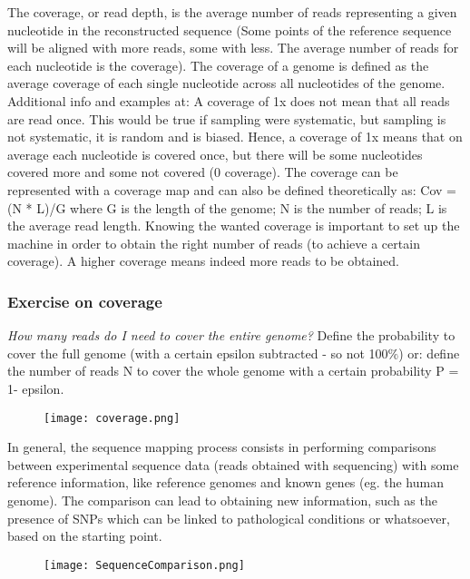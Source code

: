 The coverage, or read depth, is the average number of reads representing a given nucleotide in the reconstructed sequence (Some points of the reference sequence will be aligned with more reads, some with less. The average number of reads for each nucleotide is the coverage). 
The coverage of a genome is defined as the average coverage of each single nucleotide across all nucleotides of the genome. Additional info and examples at:  
A coverage of 1x does not mean that all reads are read once. This would be true if sampling were systematic, but sampling is not systematic, it is random and is biased. Hence, a coverage of 1x means that on average each nucleotide is covered once, but there will be some nucleotides covered more and some not covered (0 coverage). 
The coverage can be represented with a coverage map and can also be defined theoretically as:
Cov = (N * L)/G
where G is the length of the genome; N is the  number of reads; L is the average read length.
Knowing the wanted coverage is important to set up the machine in order to obtain the right number of reads (to achieve a certain coverage). A higher coverage means indeed more reads to be obtained. 

\subsubsection{Exercise on coverage}

\emph{How many reads do I need to cover the entire genome?}
Define the probability  to cover the full genome (with a certain epsilon subtracted - so not 100$\%$) or: define the number of reads N to cover the whole genome with a certain probability P = 1- epsilon.

\begin{figure}[h]
\centering
\texttt{[image: coverage.png]}
\caption{}
\end{figure}

In general, the sequence mapping process consists in performing comparisons between experimental sequence data (reads obtained with sequencing) with some reference information, like reference genomes and known genes (eg. the human genome). The comparison can lead to obtaining new information, such as the presence of SNPs which can be linked to pathological conditions or whatsoever, based on the starting point.

\begin{figure}[h]
\centering
\texttt{[image: SequenceComparison.png]}
\caption{}
\end{figure}

